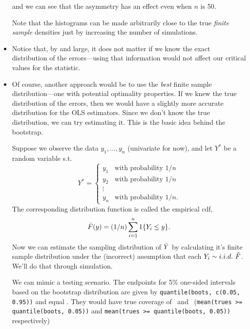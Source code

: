 \begin{itemize}[leftmargin=0pt]
  and we can see that the asymmetry has an effect even when $n$ is 50.

  Note that the histograms can be made arbitrarily close to the true
  \emph{finite sample} densities just by increasing the number of
  simulations.

\item Notice that, by and large, it does not matter if we know the
  exact distribution of the errors---using that information would not
  affect our critical values for the statistic.

\item Of course, another approach would be to use the \emph{best}
  finite sample distribution---one with potential optimality properties.
  If we knew the true distribution of the errors, then we would have a
  slightly more accurate distribution for the OLS estimators.  Since
  we don't know the true distribution, we can try estimating it.  This
  is the basic idea behind the bootstrap.

  Suppose we observe the data $y_1,...,y_n$ (univariate for now), and
  let $Y^*$ be a random variable s.t.
  \begin{equation*}
    Y^* =
    \begin{cases}
      y_1 & \text{with probability } 1/n \\
      y_2 & \text{with probability } 1/n \\
      \vdots \\
      y_n & \text{with probability } 1/n.
    \end{cases}
  \end{equation*}
  The corresponding distribution function is called the empirical cdf,
  \begin{equation*}
    \hat{F}(y) = (1/n) \sum_{i=1}^n \operatorname{1}\{ Y_i \leq y \}.
  \end{equation*}
  Now we can estimate the sampling distribution of $\bar{Y}$ by
  calculating it's finite sample distribution under the (incorrect)
  assumption that each $Y_i \sim i.i.d.\ \hat{F}$.  We'll do that through
  simulation.

  \renewcommand*\FancyVerbStartString{## block 3}

  We can mimic a testing scenario.  The endpoints for 5\% one-sided
  intervals based on the bootstrap distribution are given by
  \verb|quantile(boots, c(0.05, 0.95))| and equal \bootquantiles.
  They would have true coverage of \bootleft\ and \bootright\
  (\verb|mean(trues >= quantile(boots, 0.05))| and
  \verb|mean(trues >= quantile(boots, 0.05))| respectively)

\end{itemize}

